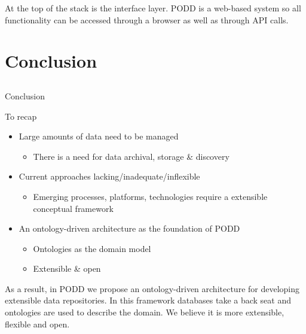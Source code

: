 \documentclass[ignorenonframetext,compress]{beamer}
\begin{document}
At the top of the stack is the interface layer. PODD is a web-based
system so all functionality can be accessed through a browser as
well as through API calls. 

\section{Conclusion}
\subsection*{ }
\begin{frame}{Conclusion}
\begin{block}{To recap}
\begin{itemize}
\item Large amounts of data need to be managed
    \begin{itemize}
    \item There is a need for data archival, storage \& discovery
    \end{itemize}
\item Current approaches lacking/inadequate/inflexible
    \begin{itemize}
    \item Emerging processes, platforms, technologies require a extensible conceptual framework
    \end{itemize}
\item An ontology-driven architecture as the foundation of PODD
    \begin{itemize}
    \item Ontologies as the domain model
    \item Extensible \& open
    \end{itemize}
\end{itemize}
\end{block}
\end{frame}

As a result, in PODD we propose an ontology-driven architecture
for developing extensible data repositories. In this framework
databases take a back seat and ontologies are used to describe
the domain. We believe it is more extensible, flexible and open.
\end{document}
